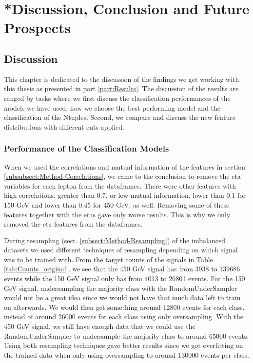 \documentclass[a4paper, american, 12pt]{report}
\begin{document}
	\part{*Discussion, Conclusion and Future Prospects}
	\label{part:Conclusion}
	
	\chapter{Discussion}  %
	\label{chap:Discussion}
	This chapter is dedicated to the discussion of the findings we get working with this thesis as presented in part \ref{part:Results}. The discussion of the results are ranged by tasks where we first discuss the classification performances of the models we have used, how we choose the best performing model and the classification of the Ntuples. Second, we compare and discuss the new feature distributions with different cuts applied.
	
	
	\section{Performance of the Classification Models}
	\label{sect:Discussion-PerformanceEval}	
	When we used the correlations and mutual information of the features in section \ref{subsubsect:Method-Correlations}, we came to the conclusion to remove the eta variables for each lepton from the dataframes. There were other features with high correlations, greater than 0.7, or low mutual information, lower than 0.1 for 150 GeV and lower than 0.45 for 450 GeV, as well. Removing some of these features together with the etas gave only worse results. This is why we only removed the eta features from the dataframes.
	
	During resampling (sect. \ref{subsect:Method-Resampling}) of the imbalanced datasets we used different techniques of resampling depending on which signal was to be trained with. From the target counts of the signals in Table \ref{tab:Counts_original}, we see that the 450 GeV signal has from 3938 to 139686 events while the 150 GeV signal only has from 4013 to 26801 events. For the 150 GeV signal, undersampling the majority class with the RandomUnderSampler would not be a great idea since we would not have that much data left to train on afterwards. We would then get something around 12800 events for each class, instead of around 26000 events for each class using only oversampling. With the 450 GeV signal, we still have enough data that we could use the RandomUnderSampler to undersample the majority class to around 65000 events. Using both resampling techniques gave better results since we got overfitting on the trained data when only using oversampling to around 130000 events per class.
	
\end{document}
